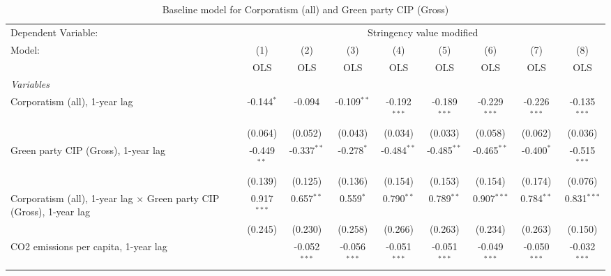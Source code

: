 
\begin{table}[htbp]
   \caption{Baseline model for Corporatism (all) and Green party CIP (Gross)}
   \centering
   \begin{tabular}{lcccccccc}
      \toprule
      Dependent Variable: & \multicolumn{8}{c}{Stringency value modified}\\
      Model:                                                                      & (1)           & (2)            & (3)            & (4)            & (5)            & (6)            & (7)            & (8)\\  
                                                                                  &  OLS          & OLS            & OLS            & OLS            & OLS            & OLS            & OLS            & OLS\\  
      \midrule
      \emph{Variables}\\
      Corporatism (all), 1-year lag                                               & -0.144$^{*}$  & -0.094         & -0.109$^{**}$  & -0.192$^{***}$ & -0.189$^{***}$ & -0.229$^{***}$ & -0.226$^{***}$ & -0.135$^{***}$\\   
                                                                                  & (0.064)       & (0.052)        & (0.043)        & (0.034)        & (0.033)        & (0.058)        & (0.062)        & (0.036)\\   
      Green party CIP (Gross), 1-year lag                                         & -0.449$^{**}$ & -0.337$^{**}$  & -0.278$^{*}$   & -0.484$^{**}$  & -0.485$^{**}$  & -0.465$^{**}$  & -0.400$^{*}$   & -0.515$^{***}$\\   
                                                                                  & (0.139)       & (0.125)        & (0.136)        & (0.154)        & (0.153)        & (0.154)        & (0.174)        & (0.076)\\   
      Corporatism (all), 1-year lag $\times$ Green party CIP (Gross), 1-year lag  & 0.917$^{***}$ & 0.657$^{**}$   & 0.559$^{*}$    & 0.790$^{**}$   & 0.789$^{**}$   & 0.907$^{***}$  & 0.784$^{**}$   & 0.831$^{***}$\\   
                                                                                  & (0.245)       & (0.230)        & (0.258)        & (0.266)        & (0.263)        & (0.234)        & (0.263)        & (0.150)\\   
      CO2 emissions per capita, 1-year lag                                        &               & -0.052$^{***}$ & -0.056$^{***}$ & -0.051$^{***}$ & -0.051$^{***}$ & -0.049$^{***}$ & -0.050$^{***}$ & -0.032$^{***}$\\   

\end{tabular}
\end{table}

